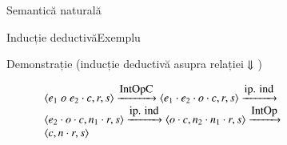 \documentclass[xcolor=pdftex,romanian,colorlinks]{beamer}
\begin{document}
\begin{section}{Semantică naturală}
\begin{frame}{Inducție deductivă}{Exemplu}
\begin{block}{Demonstrație (inducție deductivă asupra relației $\S{}{}$)}
\begin{description}
     \item[]\vspace{-1ex}$\begin{array}{l}
  \c{e_1\mathrel{o} e_2 \cdot c, r, s} \xrightarrow{\mbox{IntOpC}} \c{e_1 \cdot e_2 \cdot o \cdot c, r, s} \xrightarrow{\mbox{ip. ind}}
\\
  \c{e_2 \cdot o \cdot c, n_1 \cdot r, s}  \xrightarrow{\mbox{ip. ind}}   \c{o \cdot c, n_2 \cdot n_1 \cdot r, s}  \xrightarrow{\mbox{IntOp}}
\\
   \c{c, n \cdot r, s}
\end{array} $
  \end{description}
\end{block}
\end{frame}

\end{section}
\end{document}
